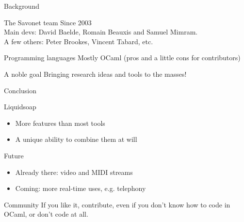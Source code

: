 \documentclass{beamer}
\begin{document}
\begin{frame}{Background}

\begin{block}{The Savonet team}
Since 2003 \\
Main devs: David Baelde, Romain Beauxis and Samuel Mimram. \\
A few others: Peter Brookes, Vincent Tabard, etc.
\end{block}

\begin{block}{Programming languages}
Mostly OCaml (pros and a little cons for contributors)
\end{block}

\begin{block}{A noble goal}
Bringing research ideas and tools to the masses!
\end{block}

\end{frame}


\begin{frame}{Conclusion}

\begin{block}{Liquidsoap}
\begin{itemize}
\item More features than most tools
\item A unique ability to combine them at will
\end{itemize}
\end{block}

\begin{block}{Future}
\begin{itemize}
\item Already there: video and MIDI streams
\item Coming: more real-time uses, e.g. telephony
\end{itemize}
\end{block}

\begin{block}{Community}
If you like it, contribute, even if you don't know how to code in
OCaml, or don't code at all.
\end{block}

\end{frame}
\end{document}
